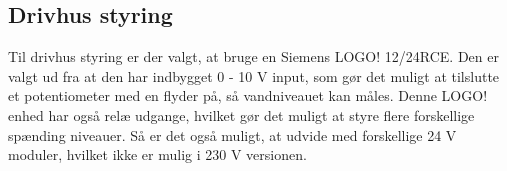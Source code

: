 \subsection{Drivhus styring}

Til drivhus styring er der valgt, at bruge en Siemens LOGO! 12/24RCE. 
Den er valgt ud fra at den har indbygget 0 - 10 V input, 
som gør det muligt at tilslutte et potentiometer med en flyder på, så vandniveauet kan måles.
Denne LOGO! enhed har også relæ udgange, hvilket gør det muligt at styre flere forskellige spænding niveauer.
Så er det også muligt, at udvide med forskellige 24 V moduler, hvilket ikke er mulig i 230 V versionen.